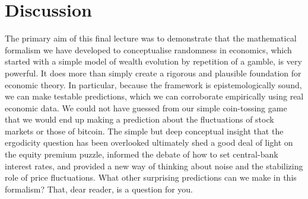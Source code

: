 \section{Discussion}
The primary aim of this final lecture was to demonstrate that the mathematical formalism we have developed to conceptualise randomness in economics, which started with a simple model of wealth evolution by repetition of a gamble, is very powerful. It does more than simply create a rigorous and plausible foundation for economic theory. In particular, because the framework is epistemologically sound, we can make testable predictions, which we can corroborate empirically using real economic data. We could not have guessed from our simple coin-tossing game that we would end up making a prediction about the fluctuations of stock markets or those of bitcoin. The simple but deep conceptual insight that the ergodicity question has been overlooked ultimately shed a good deal of light on the equity premium puzzle, informed the debate of how to set central-bank interest rates, and provided a new way of thinking about noise and the stabilizing role of price fluctuations. What other surprising predictions can we make in this formalism? That, dear reader, is a question for you.

